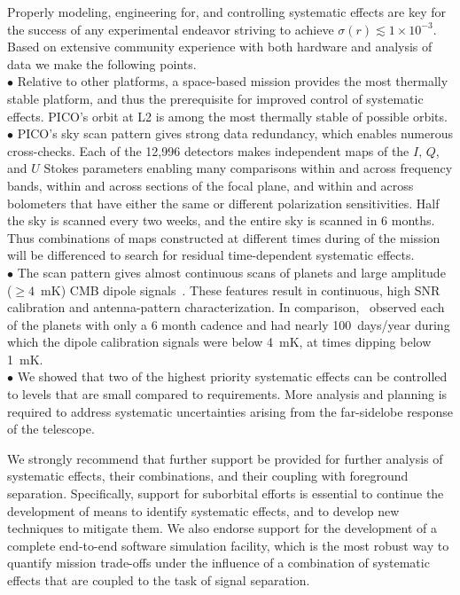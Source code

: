 \documentclass[PICOReport.tex]{subfiles}
\begin{document}
Properly modeling, engineering for, and controlling systematic effects are key for the success of any experimental endeavor striving to achieve $\sigma(r) \lesssim 1 \times 10^{-3}$. Based on extensive community experience with both hardware and analysis of data we make the following points. \\
$\bullet$ \hspace{0.1in}  Relative to other platforms, a space-based mission provides the most thermally stable platform, and thus the prerequisite for improved control of systematic effects. PICO's orbit at L2 is among the most thermally stable of possible orbits. \\
$\bullet$ \hspace{0.1in} PICO's sky scan pattern gives strong data redundancy, which enables numerous cross-checks. Each of the 12,996 detectors makes independent maps of the $I,\,Q$, and $U$ Stokes parameters enabling many comparisons within and across frequency bands, within and across sections of the focal plane, and within and across bolometers that have either the same or different polarization sensitivities. Half the sky is scanned every two weeks, and the entire sky is scanned in 6 months. Thus combinations of maps constructed at different times during of the mission will be differenced to search for residual time-dependent systematic effects. \\
$\bullet$ \hspace{0.1in}  The scan pattern gives almost continuous scans of planets and large amplitude ($\geq 4$~mK) CMB dipole signals~\citep{picoweb_dipole}. These features result in continuous, high \ac{SNR} calibration and antenna-pattern characterization. In comparison, \planck\ observed each of the planets with only a 6 month cadence and had nearly 100~days/year during which the dipole calibration signals were below 4~mK, at times dipping below 1~mK. \\
$\bullet$ \hspace{0.1in}  We showed that two of the highest priority systematic effects can be controlled to levels that are small compared to requirements. More analysis and planning is required to address systematic uncertainties arising from the far-sidelobe response of the telescope. 

We strongly recommend that further support be provided for further analysis of systematic effects, their combinations, and their coupling with foreground separation. Specifically, support for suborbital efforts is essential to continue the development of means to identify systematic effects, and to develop new techniques to mitigate them. We also endorse support for the development of a complete end-to-end software simulation facility, which is the most robust way to quantify mission trade-offs under the influence of a combination of systematic effects that are coupled to the task of signal separation.  
\end{document}
